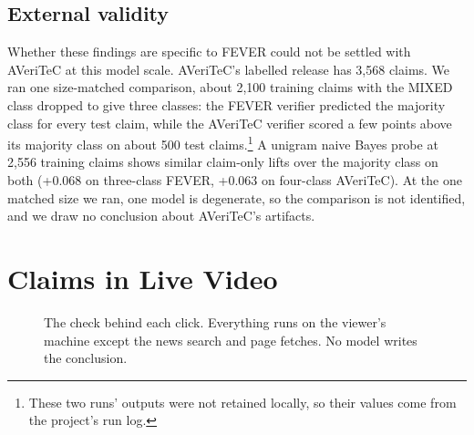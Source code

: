\documentclass[11pt]{article}
\begin{document}
\subsection{External validity}

Whether these findings are specific to FEVER could not be settled with AVeriTeC
\citep{schlichtkrull2023averitec} at this model scale. AVeriTeC's labelled release has 3,568 claims. We ran
one size-matched comparison, about 2,100 training claims with the MIXED class dropped to give three classes:
the FEVER verifier predicted the majority class for every test claim, while the AVeriTeC verifier scored a
few points above its majority class on about 500 test claims.\footnote{These two runs' outputs were not
retained locally, so their values come from the project's run log.} A unigram naive Bayes probe at 2,556
training claims shows similar claim-only lifts over the majority class on both (+0.068 on three-class FEVER,
+0.063 on four-class AVeriTeC). At the one matched size we ran, one model is degenerate, so the comparison
is not identified, and we draw no conclusion about AVeriTeC's artifacts.

\section{Claims in Live Video}
\label{sec:video}

\begin{figure}[t]
\centering
{}
\caption{The check behind each click. Everything runs on the viewer's machine except the news search and
page fetches. No model writes the conclusion.}
\label{fig:pipeline}
\end{figure}
\end{document}
